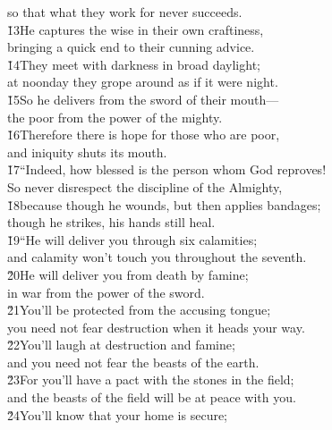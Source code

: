 \begin{poetry}
\poemll    so that what they work for never succeeds. \\
\poeml \v{13}He captures the wise in their own craftiness, \\
\poemll    bringing a quick end to their cunning advice. \\
\poeml \v{14}They meet with darkness in broad daylight; \\
\poemll    at noonday they grope around as if it were night. \\
\poeml \v{15}So he delivers from the sword of their mouth--- \\
\poemll    the poor from the power of the mighty. \\
\poeml \v{16}Therefore there is hope for those who are poor, \\
\poemll    and iniquity shuts its mouth. \\
\poeml \v{17}``Indeed, how blessed is the person whom God reproves! \\
\poemll    So never disrespect the discipline of the Almighty, \\
\poeml \v{18}because though he wounds, but then applies bandages; \\
\poemll    though he strikes, his hands still heal. \\
\poeml \v{19}``He will deliver you through six calamities; \\
\poemll    and calamity won't touch you throughout the seventh. \\
\poeml \v{20}He will deliver you from death by famine; \\
\poemll    in war from the power of the sword. \\
\poeml \v{21}You'll be protected from the accusing tongue; \\
\poemll    you need not fear destruction when it heads your way. \\
\poeml \v{22}You'll laugh at destruction and famine; \\
\poemll    and you need not fear the beasts of the earth. \\
\poeml \v{23}For you'll have a pact with the stones in the field; \\
\poemll    and the beasts of the field will be at peace with you. \\
\poeml \v{24}You'll know that your home is secure; \\

\end{poetry}
